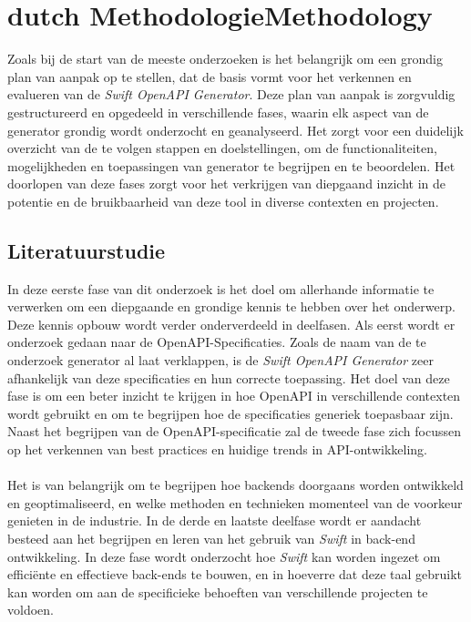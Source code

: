 
\chapter
{\IfLanguageName
    {dutch}
    {Methodologie}{Methodology}}%
\label{ch:methodologie}

Zoals bij de start van de meeste onderzoeken is het belangrijk om een grondig plan van aanpak op 
te stellen, dat de basis vormt voor het verkennen en evalueren van de \textit{Swift OpenAPI Generator}. 
Deze plan van aanpak is zorgvuldig gestructureerd en opgedeeld in verschillende fases, waarin elk aspect van de generator grondig wordt onderzocht en geanalyseerd. 
Het zorgt voor een duidelijk overzicht van de te volgen stappen en doelstellingen, om de functionaliteiten, mogelijkheden en toepassingen van generator te begrijpen en te beoordelen. 
Het doorlopen van deze fases zorgt voor het verkrijgen van diepgaand inzicht in de potentie en de bruikbaarheid van deze tool in diverse contexten en projecten. 

\section{Literatuurstudie}
In deze eerste fase van dit onderzoek is het doel om allerhande informatie te verwerken om een diepgaande en grondige kennis te hebben over het onderwerp. Deze kennis opbouw wordt verder onderverdeeld in deelfasen. Als eerst wordt er onderzoek gedaan naar de OpenAPI-Specificaties. Zoals de naam van de te onderzoek generator al laat verklappen, is de \textit{Swift OpenAPI Generator} zeer afhankelijk van deze specificaties en hun correcte toepassing. Het doel van deze fase is om een beter inzicht te krijgen in hoe OpenAPI in verschillende contexten wordt gebruikt en om te begrijpen hoe de specificaties generiek toepasbaar zijn. Naast het begrijpen van de OpenAPI-specificatie zal de tweede fase zich focussen op het verkennen van best practices en huidige trends in API-ontwikkeling.  \\ \\ Het is van belangrijk om te begrijpen hoe backends doorgaans worden ontwikkeld en geoptimaliseerd, en welke methoden en technieken momenteel van de voorkeur genieten in de industrie. In de derde en laatste deelfase wordt er aandacht besteed aan het begrijpen en leren van het gebruik van \textit{Swift} in back-end ontwikkeling. In deze fase wordt onderzocht hoe \textit{Swift} kan worden ingezet om efficiënte en effectieve back-ends te bouwen, en in hoeverre dat deze taal gebruikt kan worden om aan de specificieke behoeften van verschillende projecten te voldoen. 

